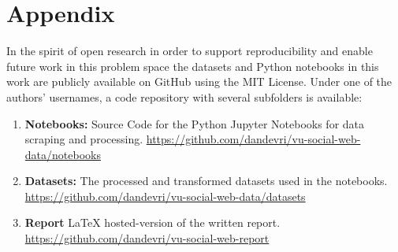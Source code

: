 \section{Appendix}

In the spirit of open research in order to support reproducibility and enable future work in this problem space the datasets and Python notebooks in this work are publicly available on GitHub using the MIT License. Under one of the authors' usernames, a code repository with several subfolders is available:

\begin{enumerate}
  \item \textbf{Notebooks:} Source Code for the Python  Jupyter Notebooks for data scraping and processing. \underline{https://github.com/dandevri/vu-social-web-data/notebooks}
  \item \textbf{Datasets:} The processed and transformed datasets used in the notebooks. \\  \underline{{https://github.com/dandevri/vu-social-web-data/datasets}}
    \item \textbf{Report} LaTeX hosted-version of the written report. \\  \underline{{https://github.com/dandevri/vu-social-web-report}}
\end{enumerate}